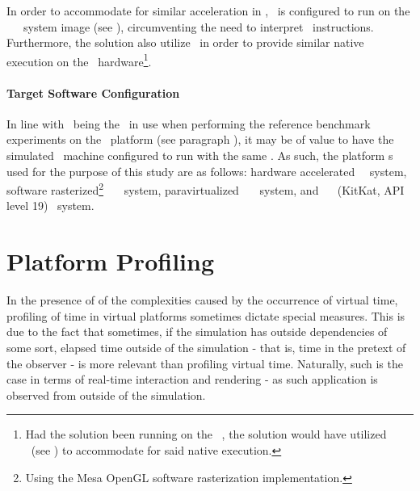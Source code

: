 In order to accommodate for similar acceleration in \dvttermqemu , \dvttermandroid\ is configured to run on the \dvttermintel\ \dvttermandroid\ \dvttermxeightysix\ system image (see ), circumventing the need to interpret \dvttermarm\ instructions.
Furthermore, the solution also utilize \dvttermkvm\ in order to provide similar native execution on the \dvttermhost\ hardware\footnote{Had the solution been running on the \dvttermwindows\ \dvttermos , the solution would have utilized \dvttermhaxm\ (see ) to accommodate for said native execution.}.

\paragraph{Target Software Configuration}
\label{par:methodologyexperiment_platformconfiguration_targetsoftwareconfiguration}
In line with \dvttermfedora\ being the \dvttermos\ in use when performing the reference benchmark experiments on the \dvttermhost\ platform (see paragraph ), it may be of value to have the simulated \dvttermtarget\ machine configured to run with the same \dvttermos .
As such, the platform \dvttermos s used for the purpose of this study are as follows: hardware accelerated \dvttermfedora\ \dvttermhost\ system, software rasterized\footnote{Using the Mesa OpenGL software rasterization implementation.} \dvttermfedora\ \dvttermsimics\ \dvttermtarget\ system, paravirtualized \dvttermfedora\ \dvttermsimics\ \dvttermtarget\ system, and \dvttermqemu\ \dvttermandroid\  (KitKat, API level 19) \dvttermtarget\ system.

\section{Platform Profiling}
\label{sec:methodologyexperiment_platformprofiling}
In the presence of of the complexities caused by the occurrence of virtual time, profiling of time in virtual platforms sometimes dictate special measures.
This is due to the fact that sometimes, if the simulation has outside dependencies of some sort, elapsed time outside of the simulation - that is, time in the pretext of the observer - is more relevant than profiling virtual time.
Naturally, such is the case in terms of real-time interaction and rendering - as such application is observed from outside of the simulation.

